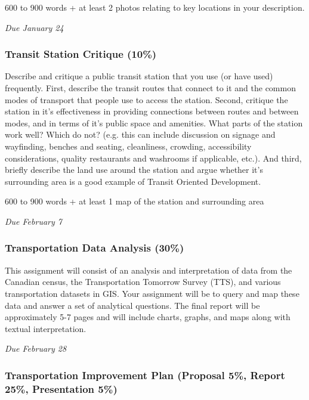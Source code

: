 \documentclass[11pt]{article}
\begin{document}
	600 to 900 words + at least 2 photos relating to key locations in your description.
	
	\textit{Due January 24}
	
	
	
	
	\subsubsection*{Transit Station Critique (10\%)}
	
	Describe and critique a public transit station that you use (or have used) frequently. First, describe the transit routes that connect to it and the common modes of transport that people use to access the station. Second, critique the station in it's effectiveness in providing connections between routes and between modes, and in terms of it's public space and amenities. What parts of the station work well? Which do not? (e.g. this can include discussion on signage and wayfinding, benches and seating, cleanliness, crowding, accessibility considerations, quality restaurants and washrooms if applicable, etc.). And third, briefly describe the land use around the station and argue whether it's surrounding area is a good example of Transit Oriented Development. 
	
	600 to 900 words + at least 1 map of the station and surrounding area
	
	\textit{Due February 7}
	
	
	
	
	\subsubsection*{Transportation Data Analysis (30\%)}
	
	This assignment will consist of an analysis and interpretation of data from the Canadian census, the Transportation Tomorrow Survey (TTS), and various transportation datasets in GIS. Your assignment will be to query and map these data and answer a set of analytical questions. The final report will be approximately 5-7 pages and will include charts, graphs, and maps along with textual interpretation.
	
	\textit{Due February 28}
	
	
	
	\subsubsection*{Transportation Improvement Plan (Proposal 5\%, Report 25\%, Presentation 5\%)}
	
\end{document}
